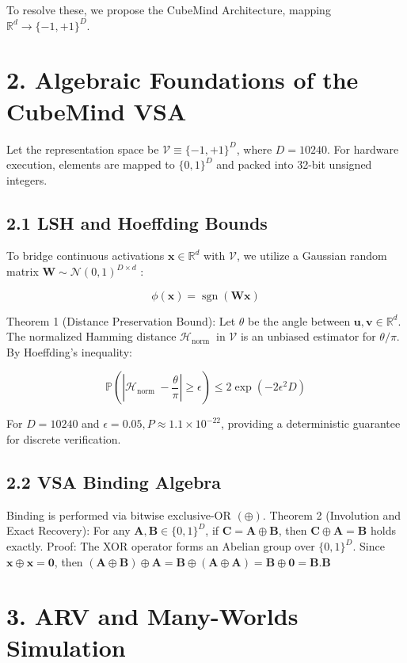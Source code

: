 \documentclass[10pt]{article}
\begin{document}
To resolve these, we propose the CubeMind Architecture, mapping $\mathbb{R}^{d} \rightarrow\{-1,+1\}^{D}$.

\section*{2. Algebraic Foundations of the CubeMind VSA}
Let the representation space be $\mathcal{V} \equiv\{-1,+1\}^{D}$, where $D=10240$. For hardware execution, elements are mapped to $\{0,1\}^{D}$ and packed into 32-bit unsigned integers.

\subsection*{2.1 LSH and Hoeffding Bounds}
To bridge continuous activations $\mathbf{x} \in \mathbb{R}^{d}$ with $\mathcal{V}$, we utilize a Gaussian random matrix $\mathbf{W} \sim \mathcal{N}(0,1)^{D \times d}$ :

$$
\phi(\mathbf{x})=\operatorname{sgn}(\mathbf{W} \mathbf{x})
$$

Theorem 1 (Distance Preservation Bound): Let $\theta$ be the angle between $\mathbf{u}, \mathbf{v} \in \mathbb{R}^{d}$. The normalized Hamming distance $\mathcal{H}_{\text {norm }}$ in $\mathcal{V}$ is an unbiased estimator for $\theta / \pi$. By Hoeffding's inequality:

$$
\mathbb{P}\left(\left|\mathcal{H}_{\text {norm }}-\frac{\theta}{\pi}\right| \geq \epsilon\right) \leq 2 \exp \left(-2 \epsilon^{2} D\right)
$$

For $D=10240$ and $\epsilon=0.05, P \approx 1.1 \times 10^{-22}$, providing a deterministic guarantee for discrete verification.

\subsection*{2.2 VSA Binding Algebra}
Binding is performed via bitwise exclusive-OR $(\oplus)$. Theorem 2 (Involution and Exact Recovery): For any $\mathbf{A}, \mathbf{B} \in\{0,1\}^{D}$, if $\mathbf{C}=\mathbf{A} \oplus \mathbf{B}$, then $\mathbf{C} \oplus \mathbf{A}=\mathbf{B}$ holds exactly. Proof: The XOR operator forms an Abelian group over $\{0,1\}^{D}$. Since $\mathbf{x} \oplus \mathbf{x}=\mathbf{0}$, then $(\mathbf{A} \oplus \mathbf{B}) \oplus \mathbf{A}=\mathbf{B} \oplus(\mathbf{A} \oplus \mathbf{A})=\mathbf{B} \oplus \mathbf{0}=\mathbf{B} . \mathbf{B}$

\section*{3. ARV and Many-Worlds Simulation}
\end{document}

